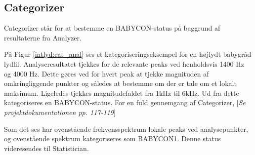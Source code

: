 \subsection{Categorizer}
Categorizer står for at bestemme en BABYCON-status på baggrund af resultaterne fra Analyzer. 

På Figur \ref{intlyd:cat_anal} ses et kategoriseringseksempel for en højlydt babygråd lydfil. Analyseresultatet tjekkes for de relevante peaks ved henholdsvis 1400 Hz og 4000 Hz. Dette gøres ved for hvert peak at tjekke magnituden af omkringliggende punkter og således at bestemme om der er tale om et lokalt maksimum. Ligeledes tjekkes magnitudefaldet fra 1kHz til 6kHz. Ud fra dette kategoriseres en BABYCON-status. For en fuld gennemgang af Categorizer, [\textit{Se projektdokumentationen pp. 117-119}]


Som det ses har ovenstående frekvensspektrum lokale peaks ved analysepunkter, og ovenstående spektrum kategoriseres som BABYCON1. Denne status videresendes til Statistician. 